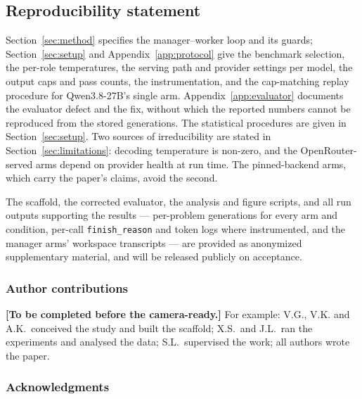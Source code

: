 \documentclass{article}
\newif\iffinalversion
\begin{document}
\subsection*{Reproducibility statement}

Section~\ref{sec:method} specifies the manager--worker loop and its guards;
Section~\ref{sec:setup} and Appendix~\ref{app:protocol} give
the benchmark selection, the per-role temperatures, the serving path and provider settings per model, the output caps and
pass counts, the instrumentation, and the cap-matching replay procedure for Qwen3.8-27B's single
arm. Appendix~\ref{app:evaluator} documents the evaluator defect and the fix, without which the
reported numbers cannot be reproduced from the stored generations. The statistical procedures are
given in Section~\ref{sec:setup}. Two sources of irreducibility are stated in
Section~\ref{sec:limitations}: decoding temperature is non-zero, and the OpenRouter-served arms
depend on provider health at run time. The pinned-backend arms, which carry the paper's claims,
avoid the second.
\iffinalversion
The orchestration scaffold (both versions), the corrected LiveCodeBench evaluator, and the
analysis and figure scripts that produce every number and figure in this paper are available at
\url{https://github.com/slee-persis/GVS5H}, together with all run outputs supporting the results
--- per-problem generations for every arm and condition, per-call \texttt{finish\_reason} and
token logs where instrumented, and the manager arms' workspace transcripts (\texttt{runs/}).
\else
The scaffold, the corrected evaluator, the analysis and figure scripts, and all run outputs
supporting the results --- per-problem generations for every arm and condition, per-call
\texttt{finish\_reason} and token logs where instrumented, and the manager arms' workspace
transcripts --- are provided as anonymized supplementary material, and will be released publicly
on acceptance.
\fi

\iffinalversion
\subsubsection*{Author contributions}

\textbf{[To be completed before the camera-ready.]} For example: V.G., V.K. and A.K.\ conceived
the study and built the scaffold; X.S.\ and J.L.\ ran the experiments and analysed the data;
S.L.\ supervised the work; all authors wrote the paper.

\subsubsection*{Acknowledgments}
\end{document}

